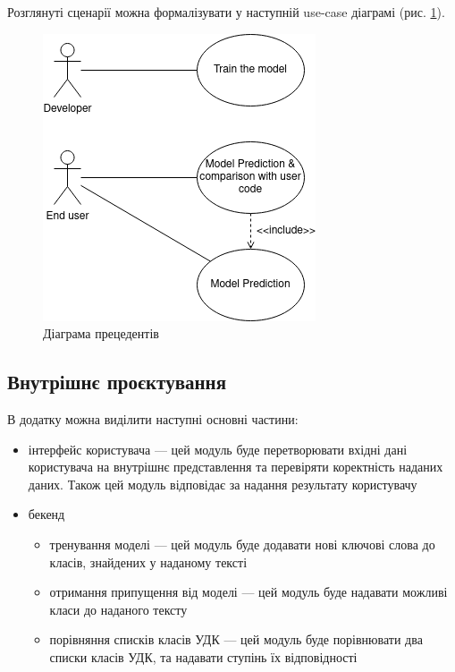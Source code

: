 \documentclass[14pt]{extarticle}
\begin{document}
  Розглянуті сценарії можна формалізувати у наступній use-case діаграмі
  (рис. \ref{fig:use-case}).

  \begin{figure}[H]
    \centering
    \includegraphics{use-case.drawio.png}    
    \caption{Діаграма прецедентів}
    \label{fig:use-case}
  \end{figure}

  \subsection{Внутрішнє проєктування}
  В додатку можна виділити наступні основні частини:
  \begin{itemize}[labelindent=\dimexpr{}\relax, leftmargin=*]
    \item інтерфейс користувача --- цей модуль буде перетворювати вхідні дані користувача на внутрішнє представлення та перевіряти коректність наданих даних. Також цей модуль відповідає за надання результату користувачу
    \item бекенд
      \begin{itemize}[labelindent=\dimexpr\parindent\relax, leftmargin=*]
        \item тренування моделі --- цей модуль буде додавати нові ключові слова до класів, знайдених у наданому тексті
        \item отримання припущення від моделі --- цей модуль буде надавати можливі класи до наданого тексту
        \item порівняння списків класів УДК --- цей модуль буде порівнювати два списки класів УДК, та надавати ступінь їх відповідності
      \end{itemize}
  \end{itemize}
  
\end{document}
